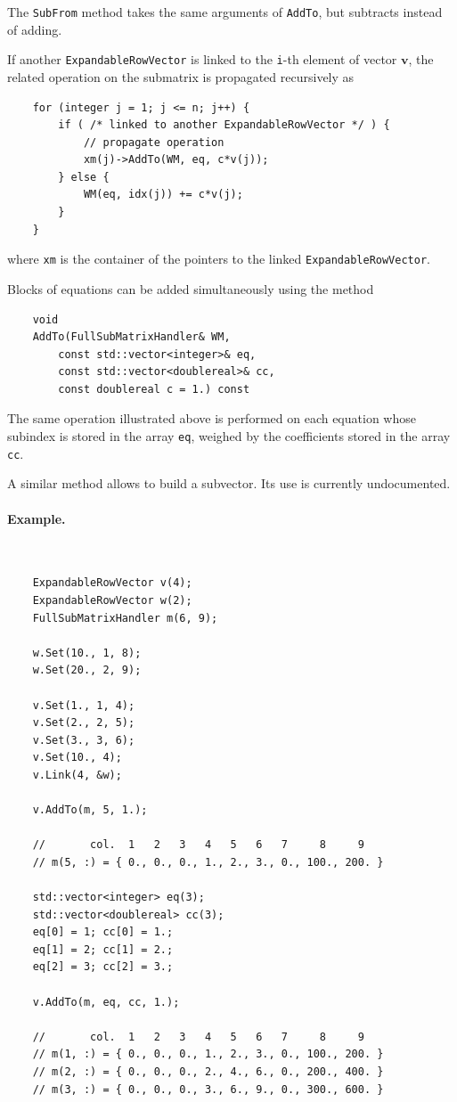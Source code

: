 \documentclass[10pt,fleqn,subeqn]{report}
\newcommand{\T}[1]{\bm{#1}}
\begin{document}
The \texttt{SubFrom} method takes the same arguments of \texttt{AddTo},
but subtracts instead of adding.

If another \texttt{ExpandableRowVector} is linked
to the \texttt{i}-th element of vector $\T{v}$,
the related operation on the submatrix is propagated recursively as
\begin{verbatim}
    for (integer j = 1; j <= n; j++) {
        if ( /* linked to another ExpandableRowVector */ ) {
            // propagate operation
            xm(j)->AddTo(WM, eq, c*v(j));
        } else {
            WM(eq, idx(j)) += c*v(j);
        }
    }
\end{verbatim}
where \texttt{xm} is the container of the pointers to the linked
\texttt{ExpandableRowVector}.

Blocks of equations can be added simultaneously using the method
\begin{verbatim}
    void
    AddTo(FullSubMatrixHandler& WM,
        const std::vector<integer>& eq,
        const std::vector<doublereal>& cc,
        const doublereal c = 1.) const
\end{verbatim}
The same operation illustrated above is performed on each equation
whose subindex is stored in the array \texttt{eq}, weighed by the
coefficients stored in the array \texttt{cc}.

A similar method allows to build a subvector.
Its use is currently undocumented.

\paragraph{Example.} \
\begin{verbatim}
    ExpandableRowVector v(4);
    ExpandableRowVector w(2);
    FullSubMatrixHandler m(6, 9);

    w.Set(10., 1, 8);
    w.Set(20., 2, 9);

    v.Set(1., 1, 4);
    v.Set(2., 2, 5);
    v.Set(3., 3, 6);
    v.Set(10., 4);
    v.Link(4, &w);

    v.AddTo(m, 5, 1.);

    //       col.  1   2   3   4   5   6   7     8     9
    // m(5, :) = { 0., 0., 0., 1., 2., 3., 0., 100., 200. }

    std::vector<integer> eq(3);
    std::vector<doublereal> cc(3);
    eq[0] = 1; cc[0] = 1.;
    eq[1] = 2; cc[1] = 2.;
    eq[2] = 3; cc[2] = 3.;

    v.AddTo(m, eq, cc, 1.);

    //       col.  1   2   3   4   5   6   7     8     9
    // m(1, :) = { 0., 0., 0., 1., 2., 3., 0., 100., 200. }
    // m(2, :) = { 0., 0., 0., 2., 4., 6., 0., 200., 400. }
    // m(3, :) = { 0., 0., 0., 3., 6., 9., 0., 300., 600. }
\end{verbatim}
\end{document}
